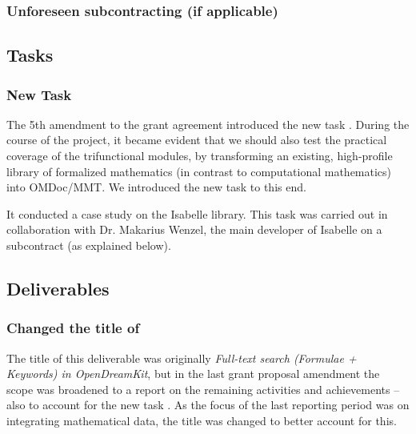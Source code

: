 
\subsubsection{Unforeseen subcontracting (if applicable)}



\subsection{Tasks}

\subsubsection{New Task }

The 5th amendment to the grant agreement introduced the new task .
During the course of the project, it became evident that we should also test the practical coverage of the trifunctional modules, by
transforming an existing, high-profile library of formalized mathematics (in contrast to computational mathematics) into OMDoc/MMT.
We introduced the new task to this end.

It conducted a case study on the Isabelle library.
This task was carried out in collaboration with Dr. Makarius Wenzel, the main developer of Isabelle on a subcontract (as explained below).

\subsection{Deliverables}

\subsubsection{Changed the title of }
The title of this deliverable was originally \emph{Full-text search
  (Formulae + Keywords) in OpenDreamKit}, but in the last grant
proposal amendment the scope was broadened to a report on the
remaining  activities and achievements -- also to
account for the new task . As the focus of
the last reporting period was on integrating mathematical data, the title was changed to better account for this.

